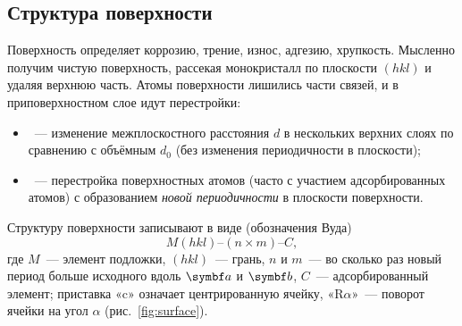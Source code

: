 \subsection{Структура поверхности}\label{ssec:surface}

Поверхность определяет коррозию, трение, износ, адгезию, хрупкость.
Мысленно получим чистую поверхность, рассекая монокристалл по плоскости
$(hkl)$ и удаляя верхнюю часть. Атомы поверхности лишились части связей,
и в приповерхностном слое идут перестройки:
\begin{itemize}
\item {}~— изменение межплоскостного расстояния $d$ в
нескольких верхних слоях по сравнению с объёмным $d_0$ (без изменения
периодичности в плоскости);
\item {}~— перестройка поверхностных атомов (часто с
участием адсорбированных атомов) с образованием \emph{новой
периодичности} в плоскости поверхности.
\end{itemize}
Структуру поверхности записывают в виде (обозначения Вуда)
\begin{equation}\label{eq:wood}
M(hkl)\text{--}(n\times m)\text{--}C ,
\end{equation}
где $M$~— элемент подложки, $(hkl)$~— грань, $n$ и $m$~— во сколько раз новый
период больше исходного вдоль $\vb a$ и $\vb b$, $C$~— адсорбированный элемент;
приставка «c» означает центрированную ячейку, «R$\alpha$»~— поворот ячейки
на угол $\alpha$ (рис.~\ref{fig:surface}).

